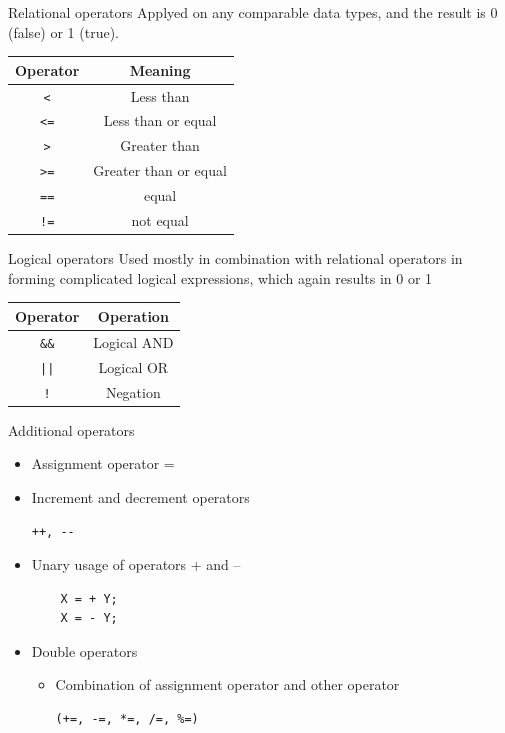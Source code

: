 \begin{frame}{Relational operators}
Applyed on any comparable data types, and the result is 0 (false) or 1 (true).
\begin{center}
\begin{tabular}{c|c}
\textbf{Operator} & \textbf{Meaning}\\
\hline
\texttt{<} & Less than \\
\texttt{<=} & Less than or equal \\
\texttt{>} & Greater than \\
\texttt{>=} & Greater than or equal \\
\texttt{==} & equal \\
\texttt{!=} & not equal
\end{tabular}
\end{center}
\end{frame}

\begin{frame}{Logical operators}
Used mostly in combination with relational operators in forming complicated
logical expressions, which again results in 0 or 1
\linebreak
\begin{center}
\begin{tabular}{c|c}
\textbf{Operator} & \textbf{Operation}\\
\hline
\texttt{\&\&} & Logical AND \\
\texttt{||} & Logical OR \\
\texttt{!} & Negation
\end{tabular}
\end{center}
\end{frame}

\begin{frame}[fragile]{Additional operators}
\begin{itemize}
\item Assignment operator =
\item Increment and decrement operators
\begin{verbatim}
++, --
\end{verbatim}
\item Unary usage of operators + and –
  \begin{verbatim}
    X = + Y;
    X = - Y;
  \end{verbatim}
\item Double operators
\begin{itemize}
\item Combination of assignment operator and other operator
\begin{verbatim}
(+=, -=, *=, /=, %=)
\end{verbatim}
\end{itemize}
\end{itemize}
\end{frame}

